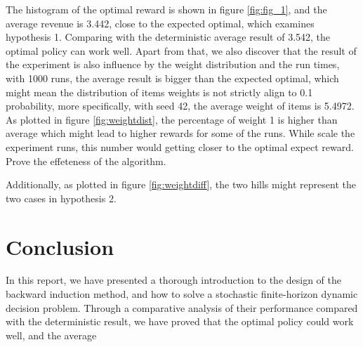 The histogram of the optimal reward is shown in figure \ref{fig:fig_1}, and the average revenue is 3.442, close to the expected optimal, which examines hypothesis 1. Comparing with the deterministic average result of 3.542, the optimal policy can work well. Apart from that, we also discover that the result of the experiment is also influence by the weight distribution and the run times, with 1000 runs, the average result is bigger than the expected optimal, which might mean the distribution of items weights is not strictly align to 0.1 probability, more specifically, with seed 42, the average weight of items is 5.4972. As plotted in figure \ref{fig:weightdist}, the percentage of weight 1 is higher than average which might lead to higher rewards for some of the runs. While scale the experiment runs, this number would getting closer to the optimal expect reward. Prove the effeteness of the algorithm.

Additionally, as plotted in figure \ref{fig:weightdiff}, the two hills might represent the two cases in hypothesis 2.

\section{Conclusion}
In this report, we have presented a thorough introduction to the design of the backward induction method, and how to solve a stochastic finite-horizon dynamic decision problem. Through a comparative analysis of their performance compared with the deterministic result, we have proved that the optimal policy could work well, and the average 
